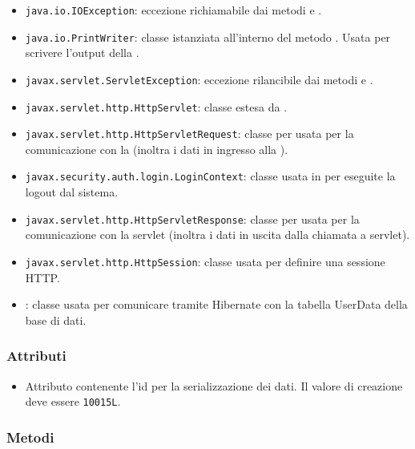 \begin{itemize}
	\item \texttt{java.io.IOException}: eccezione richiamabile dai metodi  e .
	\item \texttt{java.io.PrintWriter}: classe istanziata all'interno del metodo . Usata per scrivere l'output della .
	\item \texttt{javax.servlet.ServletException}: eccezione rilancibile dai metodi  e .
	\item \texttt{javax.servlet.http.HttpServlet}: classe estesa da .
	\item \texttt{javax.servlet.http.HttpServletRequest}:  classe per usata per la comunicazione con la  (inoltra i dati in ingresso alla ).
	\item \texttt{javax.security.auth.login.LoginContext}: classe usata in  per eseguite la logout dal sistema.
	\item \texttt{javax.servlet.http.HttpServletResponse}: classe per usata per la comunicazione con la servlet (inoltra i dati in uscita dalla chiamata a servlet).
	\item \texttt{javax.servlet.http.HttpSession}: classe usata per definire una sessione HTTP.
	\item {}: classe usata per comunicare tramite Hibernate con la tabella UserData della base di dati.
\end{itemize}

\subsubsection*{Attributi}

\begin{itemize}
	\item{}
	Attributo contenente l'id per la serializzazione dei dati. Il valore di creazione deve essere \texttt{10015L}.
\end{itemize}

\subsubsection*{Metodi}

